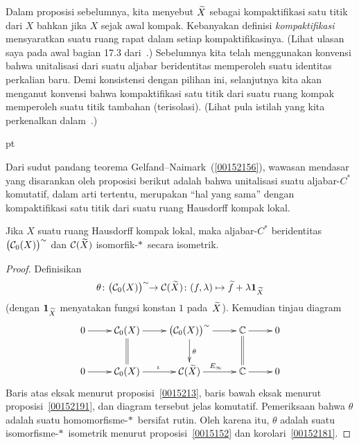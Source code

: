 Dalam proposisi sebelumnya, kita menyebut $\widetilde{X}$ sebagai kompaktifikasi satu titik dari $X$
bahkan jika $X$ sejak awal kompak. Kebanyakan definisi \emph{kompaktifikasi} mensyaratkan
suatu ruang rapat dalam setiap kompaktifikasinya. (Lihat ulasan saya pada awal
bagian 17.3 dari~\cite{Erdman:2007}.) Sebelumnya kita telah menggunakan konvensi bahwa
unitalisasi dari suatu aljabar beridentitas memperoleh suatu identitas perkalian baru.
Demi konsistensi dengan pilihan ini, selanjutnya kita akan menganut konvensi bahwa
kompaktifikasi satu titik dari suatu ruang kompak memperoleh suatu titik tambahan
(terisolasi). (Lihat pula istilah yang kita perkenalkan
dalam~.)

  pt

Dari sudut pandang teorema Gelfand--Naimark~(\ref{00152156}), wawasan mendasar yang
disarankan oleh proposisi berikut adalah bahwa unitalisasi suatu aljabar-$C^*$ komutatif,
dalam arti tertentu, merupakan ``hal yang sama'' dengan kompaktifikasi satu titik dari
suatu ruang Hausdorff kompak lokal.

\begin{prop}\label{00152194} Jika $X$ suatu ruang Hausdorff kompak lokal, maka
aljabar-$C^*$ beridentitas $\bigl(\mathcal{C}_0(X)\bigr)^\sim$ dan $\mathcal{C}(\widetilde{X})$
isomorfik-$*\,$ secara isometrik.
\end{prop}

\begin{proof} Definisikan
  \[ \theta\colon \bigl(\mathcal{C}_0(X)\bigr)^\sim \!\!\rightarrow \mathcal{C}(\widetilde{X})\colon
                         (f,\lambda) \mapsto \widetilde{f} + \lambda \mathbf{1}_{\widetilde{X}} \]
(dengan $\mathbf{1}_{\widetilde{X}}$ menyatakan fungsi konstan $1$ pada~$\widetilde{X}$). Kemudian tinjau diagram
  \[\xymatrix{
     0\ar[r] & \fml C_0(X)\ar[r]\ar@{=}[d] & \bigl(\fml C_0(X)\bigr)^\sim\ar[r]\ar[d]^\theta
             & \C\ar[r]\ar@{=}[d] & 0 \\
     0\ar[r] & \fml C_0(X)\ar[r]^\iota & \fml C(\wt X)\ar[r]^{E_\infty} & \C\ar[r] & 0
  }\]
Baris atas eksak menurut proposisi~\ref{0015213}, baris bawah eksak menurut
proposisi~\ref{00152191}, dan diagram tersebut jelas komutatif. Pemeriksaan bahwa $\theta$
adalah suatu homomorfisme-$*\,$ bersifat rutin. Oleh karena itu, $\theta$ adalah suatu
isomorfisme-$*\,$ isometrik menurut proposisi~\ref{0015152} dan
korolari~\ref{00152181}.
\end{proof}



















